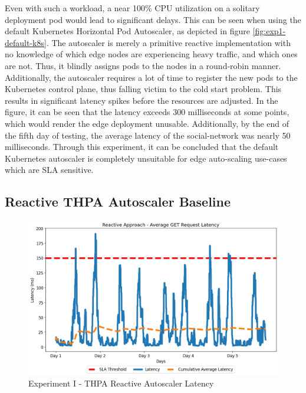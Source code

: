 Even with such a workload, a near 100\% CPU utilization on a solitary deployment pod would lead to significant delays. This can be seen when using the default Kubernetes Horizontal Pod Autoscaler, as depicted in figure \ref{fig:exp1-default-k8s}. The autoscaler is merely a primitive reactive implementation with no knowledge of which edge nodes are experiencing heavy traffic, and which ones are not. Thus, it blindly assigns pods to the nodes in a round-robin manner. Additionally, the autoscaler requires a lot of time to register the new pods to the Kubernetes control plane, thus falling victim to the cold start problem. This results in significant latency spikes before the resources are adjusted. In the figure, it can be seen that the latency exceeds 300 milliseconds at some points, which would render the edge deployment unusable. Additionally, by the end of the fifth day of testing, the average latency of the social-network was nearly 50 milliseconds. Through this experiment, it can be concluded that the default Kubernetes autoscaler is completely unsuitable for edge auto-scaling use-cases which are SLA sensitive.\par

\subsection {Reactive THPA Autoscaler Baseline}
\label{subsec:ch5-exp1-reactive-algo}

\begin{figure}[htb]
    \centering
    \caption{Experiment I - THPA Reactive Autoscaler Latency}
    \label{fig:exp1-reactive-k8s}
    \includegraphics[width=0.6\linewidth]{Figures/Home-Timeline-Reactive-Latency.png}
\end{figure}

